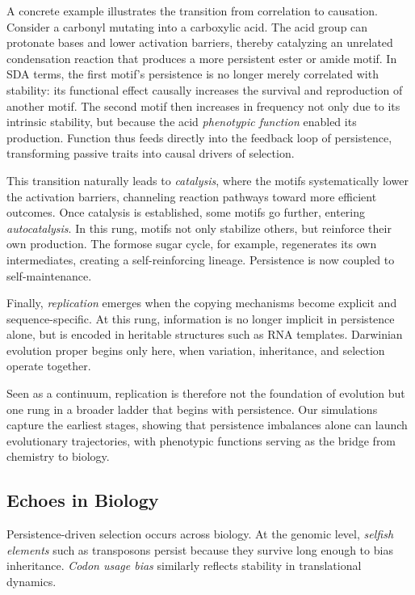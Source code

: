 \documentclass[life,article,submit,pdftex,moreauthors]{Definitions/mdpi}
\begin{document}
A concrete example illustrates the transition from correlation to causation. Consider a carbonyl mutating into a carboxylic acid. The acid group can protonate bases and lower activation barriers, thereby catalyzing an unrelated condensation reaction that produces a more persistent ester or amide motif. In SDA terms, the first motif’s persistence is no longer merely correlated with stability: its functional effect causally increases the survival and reproduction of another motif. The second motif then increases in frequency not only due to its intrinsic stability, but because the acid \emph{phenotypic function} enabled its production. Function thus feeds directly into the feedback loop of persistence, transforming passive traits into causal drivers of selection.  

This transition naturally leads to \emph{catalysis}, where the motifs systematically lower the activation barriers, channeling reaction pathways toward more efficient outcomes. Once catalysis is established, some motifs go further, entering \emph{autocatalysis}. In this rung, motifs not only stabilize others, but reinforce their own production. The formose sugar cycle, for example, regenerates its own intermediates, creating a self-reinforcing lineage. Persistence is now coupled to self-maintenance.  

Finally, \emph{replication} emerges when the copying mechanisms become explicit and sequence-specific. At this rung, information is no longer implicit in persistence alone, but is encoded in heritable structures such as RNA templates. Darwinian evolution proper begins only here, when variation, inheritance, and selection operate together.  

Seen as a continuum, replication is therefore not the foundation of evolution but one rung in a broader ladder that begins with persistence. Our simulations capture the earliest stages, showing that persistence imbalances alone can launch evolutionary trajectories, with phenotypic functions serving as the bridge from chemistry to biology.


\subsection{Echoes in Biology}  
Persistence-driven selection occurs across biology. At the genomic level, \textit{selfish elements} such as transposons persist because they survive long enough to bias inheritance. 
\textit{Codon usage bias} similarly reflects stability in translational dynamics.  
\end{document}
